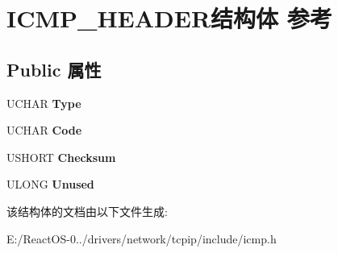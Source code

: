 \hypertarget{struct_i_c_m_p___h_e_a_d_e_r}{}\section{I\+C\+M\+P\+\_\+\+H\+E\+A\+D\+E\+R结构体 参考}
\label{struct_i_c_m_p___h_e_a_d_e_r}
\subsection*{Public 属性}
\begin{DoxyCompactItemize}
\item 
\mbox{\label{struct_i_c_m_p___h_e_a_d_e_r_a6491c5aa35e7dcfaaf07d51a3673136d}} 
U\+C\+H\+AR {\bfseries Type}
\item 
\mbox{\label{struct_i_c_m_p___h_e_a_d_e_r_ab131d307e15c4ea62c05cd8685780dd5}} 
U\+C\+H\+AR {\bfseries Code}
\item 
\mbox{\label{struct_i_c_m_p___h_e_a_d_e_r_a1f23c1ca4edda673df4594464b466b48}} 
U\+S\+H\+O\+RT {\bfseries Checksum}
\item 
\mbox{\label{struct_i_c_m_p___h_e_a_d_e_r_a6bbde9a533bb28e123aee7e9b128aeaa}} 
U\+L\+O\+NG {\bfseries Unused}
\end{DoxyCompactItemize}


该结构体的文档由以下文件生成\+:\begin{DoxyCompactItemize}
\item 
E\+:/\+React\+O\+S-\/0../drivers/network/tcpip/include/icmp.\+h\end{DoxyCompactItemize}
